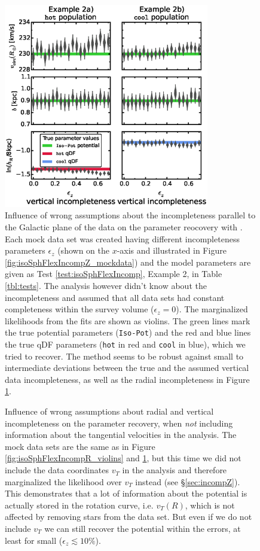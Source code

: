 \begin{figure}
\includegraphics[width=0.8\textwidth]{figs/isoSphFlexIncompZ_violins_2.eps}
\caption{Influence of wrong assumptions about the incompleteness parallel to the Galactic plane of the data on the parameter reocovery with \RM{}. Each mock data set was created having different incompleteness parameters $\epsilon_z$ (shown on the $x$-axis and illustrated in Figure \ref{fig:isoSphFlexIncompZ_mockdata}) and the model parameters are given as Test \ref{test:isoSphFlexIncomp}, Example 2, in Table \ref{tbl:tests}. The analysis however didn't know about the incompleteness and assumed that all data sets had constant completeness within the survey volume ($\epsilon_z = 0$). The marginalized likelihoods from the fits are shown as violins. The green lines mark the true potential parameters (\texttt{Iso-Pot}) and the red and blue lines the true qDF parameters (\texttt{hot} \MAP{} in red and \texttt{cool} \MAP{} in blue), which we tried to recover. The \RM{} method seems to be robust against small to intermediate deviations between the true and the assumed vertical data incompleteness, as well as the radial incompleteness in Figure \ref{fig:isoSphFlexIncompZ_violins}.} 
\label{fig:isoSphFlexIncompZ_violins}
\end{figure}

\begin{figure}
\caption{Influence of wrong assumptions about radial and vertical incompleteness on the parameter recovery, when \emph{not} including information about the tangential velocities in the analysis. The mock data sets are the same as in Figure \ref{fig:isoSphFlexIncompR_violins} and \ref{fig:isoSphFlexIncompZ_violins}, but this time we did not include the data coordinates $v_T$ in the analysis and therefore marginalized the likelihood over $v_T$ instead (see \S\ref{sec:incompZ}). This demonstrates that a lot of information about the potential is actually stored in the rotation curve, i.e. $v_T(R)$, which is not affected by removing stars from the data set. But even if we do not include $v_T$ we can still recover the potential within the errors, at least for small ($\epsilon_z \lesssim 10\%$).} 
\label{fig:isoSphFlexIncomp_marginal_violins}
\end{figure}

